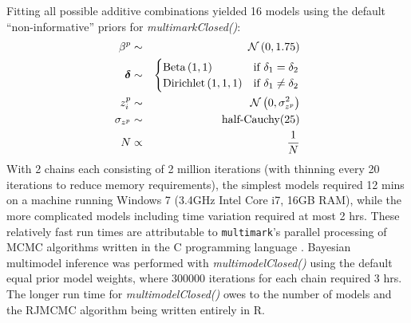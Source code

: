 \documentclass[12pt]{article}
\begin{document}
Fitting all possible additive combinations yielded 16 models using the default ``non-informative'' priors for \textit{multimarkClosed()}:
\begin{eqnarray*}
  \beta^p & \sim & {\cal N} \left( 0, 1.75 \right) \\
  \boldsymbol{\delta} & \sim & \begin{cases}
                                  \text{Beta} \left( 1, 1 \right) & \text{if } \delta_1 = \delta_2 \\
                                  \text{Dirichlet} \left( 1, 1, 1 \right) & \text{if } \delta_1 \ne \delta_2
                               \end{cases} \\
  z^p_i & \sim & {\cal N} \left( 0, \sigma^2_{z^p} \right) \\
  \sigma_{z^p} & \sim & \text{half-Cauchy}(25)\\
  N & \propto & \frac{1}{N}
\end{eqnarray*}
With 2 chains each consisting of 2 million iterations (with thinning every 20 iterations to reduce memory requirements), the simplest models required 12 mins on a machine running Windows 7 (3.4GHz Intel Core i7, 16GB RAM), while the more complicated models including time variation required at most 2 hrs. These relatively fast run times are attributable to \verb|multimark|'s parallel processing of MCMC algorithms written in the C programming language \citep{KernighanRitchie1988}. Bayesian multimodel inference was performed with \textit{multimodelClosed()} using the default equal prior model weights, where 300000 iterations for each chain required 3 hrs. The longer run time for \textit{multimodelClosed()} owes to the number of models and the RJMCMC algorithm being written entirely in R.
\end{document}
